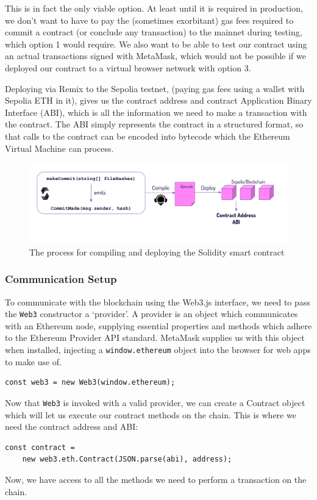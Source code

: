 \documentclass[12pt,a4paper]{article}
\begin{document}
This is in fact the only viable option. At least until it is required in production, we don't want to have to pay the (sometimes exorbitant) gas fees required to commit a contract (or conclude any transaction) to the mainnet during testing, which option 1 would require. We also want to be able to test our contract using an actual transactions signed with MetaMask, which would not be possible if we deployed our contract to a virtual browser network with option 3.

Deploying via Remix to the Sepolia testnet, (paying gas fees using a wallet with Sepolia ETH in it), gives us the contract address and contract Application Binary Interface (ABI), which is all the information we need to make a transaction with the contract. The ABI simply represents the contract in a structured format, so that calls to the contract can be encoded into bytecode which the Ethereum Virtual Machine can process.
\begin{figure}[H]
    \centering
    \includegraphics[scale=0.6]{deploy.png}
    \caption{The process for compiling and deploying the Solidity smart contract}
\end{figure}
\subsubsection{Communication Setup}
To communicate with the blockchain using the Web3.js interface, we need to pass the \verb|Web3| constructor a `provider'.
A provider is an object which communicates with an Ethereum node, supplying essential properties and methods which adhere to the Ethereum Provider API standard. MetaMask supplies us with this object when installed, injecting a \verb|window.ethereum| object into the browser for web apps to make use of.
\begin{lstlisting}
const web3 = new Web3(window.ethereum);
\end{lstlisting}
Now that \verb|Web3| is invoked with a valid provider, we can create a Contract object which will let us execute our contract methods on the chain. This is where we need the contract address and ABI:
\begin{lstlisting}
const contract = 
    new web3.eth.Contract(JSON.parse(abi), address);
\end{lstlisting}
Now, we have access to all the methods we need to perform a transaction on the chain.
\end{document}
